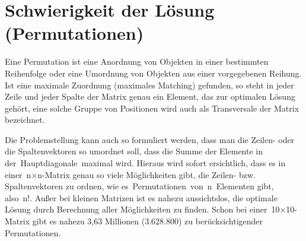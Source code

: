 %
%
%
\section{Schwierigkeit der Lösung (Permutationen)
\label{munkres:section:teil2}}

Eine Permutation ist eine Anordnung von Objekten in einer bestimmten Reihenfolge oder eine Umordnung von Objekten aus einer vorgegebenen Reihung. Ist eine maximale Zuordnung (maximales Matching) gefunden, so steht in jeder Zeile und jeder Spalte der Matrix genau ein Element, das zur optimalen Lösung gehört, eine solche Gruppe von Positionen wird auch als Transversale der Matrix bezeichnet. 

Die Problemstellung kann auch so formuliert werden, dass man die Zeilen- oder die Spaltenvektoren so umordnet soll, dass die Summe der Elemente in der Hauptdiagonale maximal wird. Hieraus wird sofort ersichtlich, dass es in einer n×n-Matrix genau so viele Möglichkeiten gibt, die Zeilen- bzw. Spaltenvektoren zu ordnen, wie es Permutationen von n Elementen gibt, also n!. Außer bei kleinen Matrizen ist es nahezu aussichtslos, die optimale Lösung durch Berechnung aller Möglichkeiten zu finden. Schon bei einer 10×10-Matrix gibt es nahezu 3,63 Millionen (3.628.800) zu berücksichtigender Permutationen.

